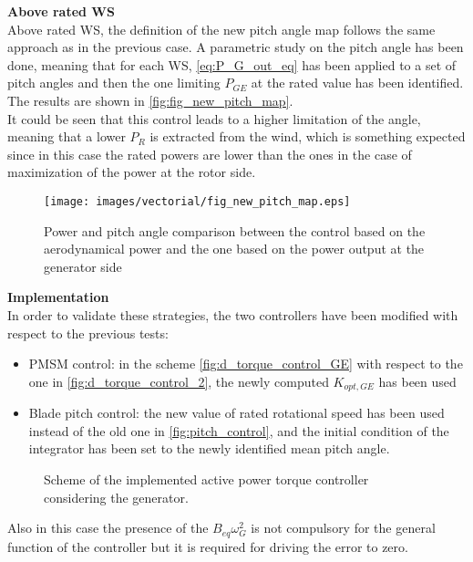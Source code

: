 \textbf{Above rated WS}\\
Above rated WS, the definition of the new pitch angle map follows the same approach as in the previous case. A parametric study on the pitch angle has been done, meaning that for each WS, \autoref{eq:P_G_out_eq} has been applied to a set of pitch angles and then the one limiting $P_{GE}$ at the rated value has been identified. The results are shown in \autoref{fig:fig_new_pitch_map}.\\ 
 It could be seen that this control leads to a higher limitation of the angle, meaning that a lower $P_R$ is extracted from the wind, which is something expected since in this case the rated powers are lower than the ones in the case of maximization of the power at the rotor side.
\begin{figure}[H]
  \centering
  \texttt{[image: images/vectorial/fig\_new\_pitch\_map.eps]}
  \caption{Power and pitch angle comparison between the control based on the aerodynamical power and the one based on the power output at the generator side}
  \label{fig:fig_new_pitch_map}
\end{figure}

\textbf{Implementation}\\
In order to validate these strategies, the two controllers have been modified with respect to the previous tests:
\begin{itemize}
  \item PMSM control: in the scheme \autoref{fig:d_torque_control_GE} with respect to the one in \autoref{fig:d_torque_control_2}, the newly computed  $K_{opt,GE}$ has been used%
  \item Blade pitch control: the new value of rated rotational speed has been used instead of the old one in \autoref{fig:pitch_control}, and the initial condition of the integrator has been set to the newly identified mean pitch angle.
\end{itemize}

\begin{figure}[H]
  \centering
  
  \caption{Scheme of the implemented active power torque controller considering the generator.}
  \label{fig:d_torque_control_GE}
\end{figure}
Also in this case the presence of the $B_{eq}\omega_G^2$ is not compulsory for the general function of the controller but it is required for driving the error to zero.

